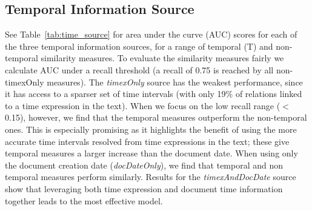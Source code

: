 \documentclass[11pt]{article}
\begin{document}
\subsection{Temporal Information Source}
\label{sec:results_timesource}
See Table~\ref{tab:time_source} for area under the curve (AUC) scores for each of the three temporal information sources, for a range of temporal (T) and non-temporal similarity measures. To evaluate the similarity measures fairly we calculate AUC under a recall threshold (a recall of 0.75 is reached by all non-timexOnly measures). The \textit{timexOnly} source has the weakest performance, since it has access to a sparser set of time intervals (with only 19\% of relations linked to a time expression in the text). When we focus on the low recall range ($<$ 0.15), however, we find that the temporal measures outperform the non-temporal ones. This is especially promising as it highlights the benefit of using the more accurate time intervals resolved from time expressions in the text; these give temporal measures a larger increase than the document date. When using only the document creation date (\textit{docDateOnly}), we find that temporal and non temporal measures perform similarly. Results for the \textit{timexAndDocDate} source show that leveraging both time expression and document time information together leads to the most effective model.
\end{document}
